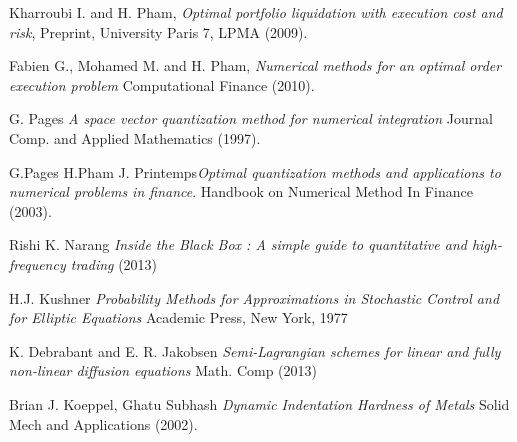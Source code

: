 \documentclass{article}
\begin{document}
\begin{thebibliography}{9}
 Kharroubi I. and H. Pham, {\it Optimal portfolio liquidation with execution cost and risk}, Preprint, University Paris 7, LPMA (2009).

 Fabien G., Mohamed M. and H. Pham, {\it Numerical methods for an optimal order execution problem} Computational Finance (2010).

 G. Pages {\it A space vector quantization method for numerical integration} Journal Comp. and Applied Mathematics (1997).

 G.Pages H.Pham J. Printemps{\it Optimal quantization methods and applications to numerical problems in finance}. Handbook on Numerical Method In Finance (2003).

 Rishi K. Narang {\it Inside the Black Box : A simple guide to quantitative and high-frequency trading} (2013)

 H.J. Kushner {\it Probability Methods for Approximations in Stochastic Control and for Elliptic Equations} Academic Press, New York, 1977

 K. Debrabant and E. R. Jakobsen {\it Semi-Lagrangian schemes for linear and fully non-linear diffusion equations} Math. Comp (2013)

 Brian J. Koeppel, Ghatu Subhash {\it Dynamic Indentation Hardness of Metals} Solid Mech and Applications (2002). 

\end{thebibliography}

%
\end{document}
